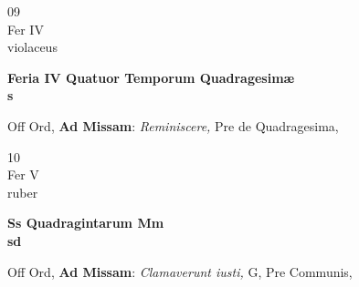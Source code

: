 \documentclass[10pt, openany]{book}
\begin{document}
        \begin{center}
            \begin{minipage}{3.5in}
                \vspace{2em}
                \begin{minipage}{0.5in}
                    {\Huge 09} \\
                    {\normalsize Fer IV} \\
                    {\normalsize violaceus}
                \end{minipage}
                \begin{minipage}{3.0in}
                    \textbf{ \large Feria IV Quatuor Temporum Quadragesimæ \\
                    \textnormal{\normalsize s}} \\ 
                \end{minipage}
                \begin{justify}Off Ord, \textbf{Ad Missam}: \textit{Reminiscere,} Pre de Quadragesima,   
                \end{justify}
            \end{minipage}
        \end{center}
    
        \begin{center}
            \begin{minipage}{3.5in}
                \vspace{2em}
                \begin{minipage}{0.5in}
                    {\Huge 10} \\
                    {\normalsize Fer V} \\
                    {\normalsize ruber}
                \end{minipage}
                \begin{minipage}{3.0in}
                    \textbf{ \large Ss Quadragintarum Mm \\
                    \textnormal{\normalsize sd}} \\ 
                \end{minipage}
                \begin{justify}Off Ord, \textbf{Ad Missam}: \textit{Clamaverunt iusti,} G, Pre Communis,   
                \end{justify}
            \end{minipage}
        \end{center}
    
\end{document}
